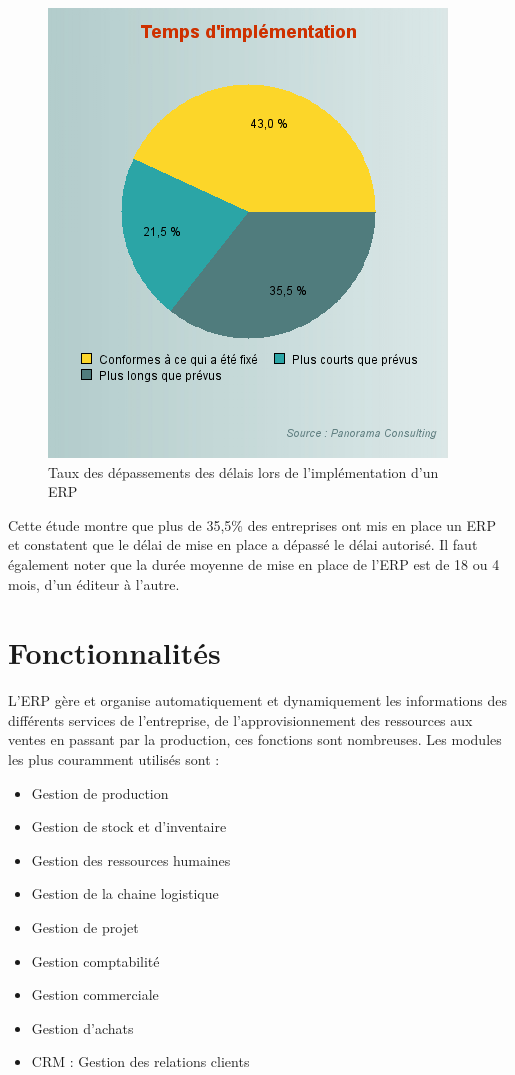 \begin{figure}[H]
    \centering
    \includegraphics[scale=0.65]{ERP/graph-taux-implementation.png}
    \caption{Taux des dépassements des délais lors de l’implémentation d’un ERP}
\end{figure} 

Cette étude montre que plus de 35,5\% des entreprises ont mis en place un \acs{ERP} et constatent que le délai de mise en place a dépassé le délai autorisé. Il faut également noter que la durée moyenne de mise en place de l'\acs{ERP} est de 18 ou 4 mois, d'un éditeur à l'autre.\\

\section{Fonctionnalités}
L'ERP gère et organise automatiquement et dynamiquement les informations des différents services de l'entreprise, de l'approvisionnement des ressources aux ventes en passant par la production, ces fonctions sont nombreuses. Les modules les plus couramment utilisés sont :\\

\begin{itemize}
    \item Gestion de production
    \item Gestion de stock et d’inventaire
    \item Gestion des ressources humaines 
    \item Gestion de la chaine logistique
    \item Gestion de projet
    \item Gestion comptabilité
    \item Gestion commerciale
    \item Gestion d’achats
    \item CRM : Gestion des relations clients\\
\end{itemize}

